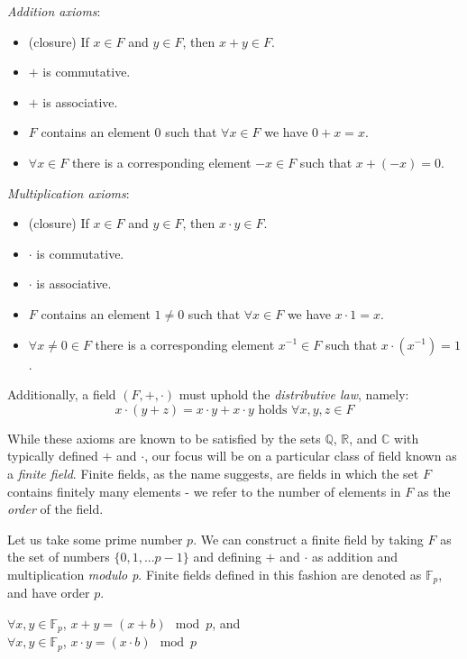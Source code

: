 \emph{Addition axioms}:
\begin{itemize}
\item (closure) If $x \in F$ and $y \in F$, then $x + y \in F$.
\item $+$ is commutative.
\item $+$ is associative.
\item $F$ contains an element 0 such that $\forall x \in F$ we have $0 + x = x$.
\item $\forall x \in F$ there is a corresponding element $-x \in F$ such that $x + (-x) = 0$.
\end{itemize}

\emph{Multiplication axioms}:
\begin{itemize}
\item (closure) If $x \in F$ and $y \in F$, then $x \cdot y \in F$.
\item $\cdot$ is commutative.
\item $\cdot$ is associative.
\item $F$ contains an element $1 \neq 0$ such that $\forall x \in F$ we have $x \cdot 1 = x$.
\item $\forall x \neq 0 \in F$ there is a corresponding element $x^{-1} \in F$ such that $x \cdot (x^{-1}) = 1$.
\end{itemize}

Additionally, a field $(F,+,\cdot)$ must uphold the \emph{distributive law}, namely:
$$
 x \cdot (y + z) = x \cdot y + x \cdot y \text{ holds } \forall x,y,z \in F
$$

While these axioms are known to be satisfied by the sets $\mathbb{Q}$, $\mathbb{R}$, and $\mathbb{C}$ with typically defined $+$ and $\cdot$, our focus will be on a particular class of field known as a \emph{finite field}. Finite fields, as the name suggests, are fields in which the set $F$ contains finitely many elements - we refer to the number of elements in $F$ as the \emph{order} of the field.

Let us take some prime number $p$. We can construct a finite field by taking $F$ as the set of numbers $\{0, 1, ... p-1\}$ and defining $+$ and $\cdot$ as addition and multiplication \emph{modulo p}. Finite fields defined in this fashion are denoted as $\mathbb{F}_p$, and have order $p$.
\begin{center}
$\forall x,y \in \mathbb{F}_p$, $x + y = (x + b) \mod{p}$, and\\
$\forall x,y \in \mathbb{F}_p$, $x \cdot y = (x \cdot b) \mod{p}$\\
\end{center}

